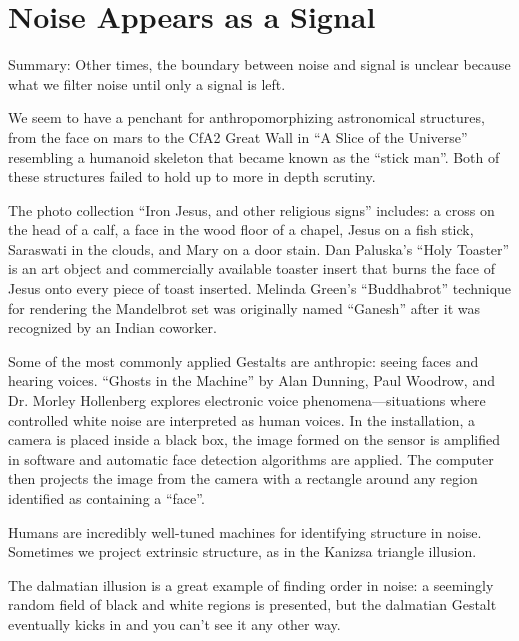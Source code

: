 \documentclass{thesis}
\begin{document}
\section{Noise Appears as a Signal}
	Summary: Other times, the boundary between noise and signal is unclear because what we filter noise until only a signal is left.

	We seem to have a penchant for anthropomorphizing astronomical structures, from the face on mars\cite{brian_dunning_facemars_2008} to the CfA2 Great Wall in ``A Slice of the Universe''\cite{de_lapparent_slice_1986} resembling a humanoid skeleton that became known as the ``stick man''. Both of these structures failed to hold up to more in depth scrutiny.
	
	The photo collection ``Iron Jesus, and other religious signs''\cite{boston.com_religious_????} includes: a cross on the head of a calf, a face in the wood floor of a chapel, Jesus on a fish stick, Saraswati in the clouds, and Mary on a door stain. Dan Paluska's ``Holy Toaster''\cite{dan_paluska_holy_2005} is an art object and commercially available toaster insert that burns the face of Jesus onto every piece of toast inserted. Melinda Green's ``Buddhabrot''\cite{melinda_green_buddhabrot_1993} technique for rendering the Mandelbrot set was originally named ``Ganesh'' after it was recognized by an Indian coworker.
	
		Some of the most commonly applied Gestalts are anthropic: seeing faces and hearing voices. ``Ghosts in the Machine'' by Alan Dunning, Paul Woodrow, and Dr. Morley Hollenberg\cite{alan_dunning_paul_woodrow_and_morley_hollenberg_einsteins_2008} explores electronic voice phenomena---situations where controlled white noise are interpreted as human voices. In the installation, a camera is placed inside a black box, the image formed on the sensor is amplified in software and automatic face detection algorithms are applied. The computer then projects the image from the camera with a rectangle around any region identified as containing a ``face''.

	Humans are incredibly well-tuned machines for identifying structure in noise. Sometimes we project extrinsic structure, as in the Kanizsa triangle illusion.\cite{alexander_bogomolny_kanizsa_????}
	
	The dalmatian illusion\cite{michael_bach_dalmatian_2002} is a great example of finding order in noise: a seemingly random field of black and white regions is presented, but the dalmatian Gestalt eventually kicks in and you can't see it any other way.
	
\end{document}
